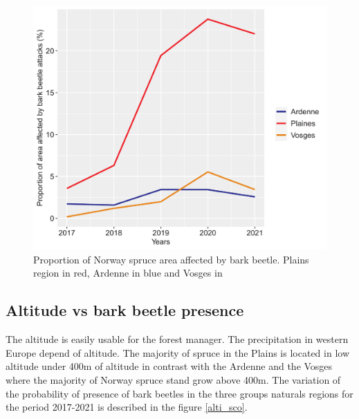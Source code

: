 \documentclass[3p,procedia]{elsarticle}
\begin{document}
\begin{figure}
   \centering
   \includegraphics[width=0.6 \textwidth]{Annual_evol_Ardennes_vosges_plaines.png}
    \caption{Proportion of Norway spruce area affected by bark beetle. Plains region in red, Ardenne in blue and Vosges in }
    \label{evol_gen}
\end{figure}

    


\subsection{ Altitude vs bark beetle presence}
The altitude is easily usable for the forest manager.
The precipitation in western Europe depend of altitude. 
The majority of spruce in the Plains is located in low altitude under 400m of altitude in contrast with the Ardenne and the Vosges where the majority of Norway spruce stand grow above 400m. 
The variation of the probability of presence of bark beetles in the three groups naturals regions for the period 2017-2021 is described in the figure \ref{alti_sco}.
\end{document}
